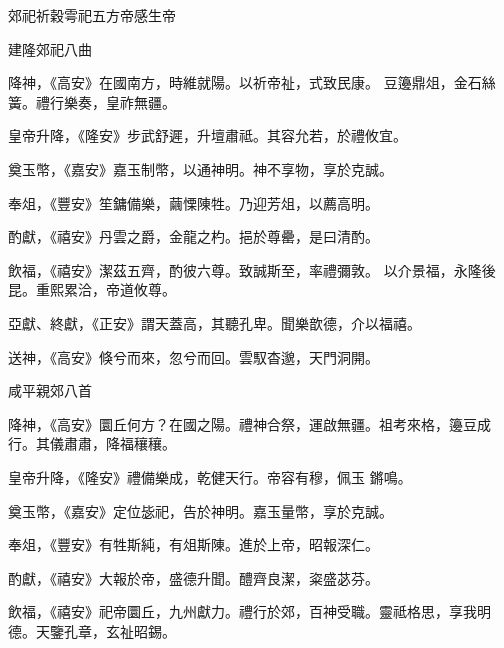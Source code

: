 
\begin{pinyinscope}

 郊祀祈穀雩祀五方帝感生帝



 建隆郊祀八曲



 降神，《高安》在國南方，時維就陽。以祈帝祉，式致民康。
 豆籩鼎俎，金石絲簧。禮行樂奏，皇祚無疆。



 皇帝升降，《隆安》步武舒遲，升壇肅祗。其容允若，於禮攸宜。



 奠玉幣，《嘉安》嘉玉制幣，以通神明。神不享物，享於克誠。



 奉俎，《豐安》笙鏞備樂，繭慄陳牲。乃迎芳俎，以薦高明。



 酌獻，《禧安》丹雲之爵，金龍之杓。挹於尊罍，是曰清酌。



 飲福，《禧安》潔茲五齊，酌彼六尊。致誠斯至，率禮彌敦。
 以介景福，永隆後昆。重熙累洽，帝道攸尊。



 亞獻、終獻，《正安》謂天蓋高，其聽孔卑。聞樂歆德，介以福禧。



 送神，《高安》倏兮而來，忽兮而回。雲馭杳邈，天門洞開。



 咸平親郊八首



 降神，《高安》圜丘何方？在國之陽。禮神合祭，運啟無疆。祖考來格，籩豆成行。其儀肅肅，降福穰穰。



 皇帝升降，《隆安》禮備樂成，乾健天行。帝容有穆，佩玉
 鏘鳴。



 奠玉幣，《嘉安》定位毖祀，告於神明。嘉玉量幣，享於克誠。



 奉俎，《豐安》有牲斯純，有俎斯陳。進於上帝，昭報深仁。



 酌獻，《禧安》大報於帝，盛德升聞。醴齊良潔，粢盛苾芬。



 飲福，《禧安》祀帝圜丘，九州獻力。禮行於郊，百神受職。靈祗格思，享我明德。天鑒孔章，玄祉昭錫。




\end{pinyinscope}
